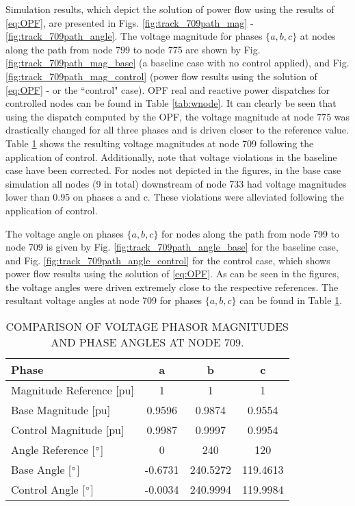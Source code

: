 Simulation results, which depict the solution of power flow using the results of \eqref{eq:OPF}, are presented in Figs. \ref{fig:track_709path_mag} - \ref{fig:track_709path_angle}. The voltage magnitude for phases $\{ a, b, c \}$ at nodes along the path from node 799 to node 775 are shown by Fig. \ref{fig:track_709path_mag_base} (a baseline case with no control applied), and Fig. \ref{fig:track_709path_mag_control} (power flow results using the solution of \eqref{eq:OPF} - or the ``control" case). OPF real and reactive power dispatches for controlled nodes can be found in Table \ref{tab:wnode}.  It can clearly be seen that using the dispatch computed by the OPF, the voltage magnitude at node 775 was drastically changed for all three phases and is driven closer to the reference value. Table \ref{table:709voltage} shows the resulting voltage magnitudes at node 709 following the application of control.  Additionally, note that voltage violations in the baseline case have been corrected.  For nodes not depicted in the figures, in the base case simulation all nodes (9 in total) downstream of node 733 had voltage magnitudes lower than 0.95 on phases a and c. These violations were alleviated following the application of control.

The voltage angle on phases $\{ a, b, c \}$ for nodes along the path from node 799 to node 709 is given by Fig. \ref{fig:track_709path_angle_base} for the baseline case, and Fig. \ref{fig:track_709path_angle_control} for the control case, which shows power flow results using the solution of \eqref{eq:OPF}.  As can be seen in the figures, the voltage angles were driven extremely close to the respective references. The resultant voltage angles at node 709 for phases $\{ a, b, c \}$ can be found in Table \ref{table:709voltage}.

\begin{table}[h]
	\centering
    \caption{COMPARISON OF VOLTAGE PHASOR MAGNITUDES AND PHASE ANGLES AT NODE 709.}
	\begin{tabular}{| l | c | c | c |}
		\hline
		Phase & a & b & c \\
		\hline
        Magnitude Reference \hfill [pu] & 1 & 1 & 1 \\
		Base Magnitude \hfill [pu] & 0.9596 & 0.9874 & 0.9554 \\		
		Control Magnitude \hfill [pu] & 0.9987 & 0.9997 & 0.9954 \\
		\hline
        Angle Reference \hfill [$\degree$] & 0 & 240 & 120 \\
		Base Angle \hfill [$\degree$] & -0.6731 & 240.5272 & 119.4613 \\
		Control Angle \hfill [$\degree$] & -0.0034 & 240.9994 & 119.9984 \\
		\hline
    \end{tabular}
    \label{table:709voltage}
\end{table}

